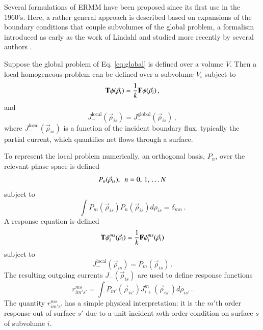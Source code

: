 Several formulations of ERMM have been proposed since its first use in 
the 1960's. Here, a rather general approach is described based 
on expansions of the boundary conditions that couple
subvolumes of the global problem, a formalism introduced 
as early as the work of Lindahl \cite{lindahl1976mdr} and
studied more recently by several authors
\cite{mosher2006ifr, roberts2011ser, roberts2012ksi}.  

Suppose the global problem 
of Eq. \ref{eq:global} is defined over a 
volume $V$.  Then a local homogeneous problem can be defined over a 
subvolume $V_i$ subject to 
\begin{equation}
  \mathbf{T} \phi(\vec{\rho}_i) = 
    \frac{1}{k} \mathbf{F} \phi(\vec{\rho}_i) \, ,
  \label{eq:local}
\end{equation}
and
\begin{equation}
  J^{\mathrm{local}}_{-} (\vec{\rho}_{is}) = 
    J^{\mathrm{global}}_{-}(\vec{\rho}_{is}) \, ,
  \label{eq:localbc}
\end{equation}   
where $J^{\mathrm{local}}_{-} (\vec{\rho}_{is}) $ is a 
function of the incident boundary flux, typically the 
partial current, which quantifies net flows through a 
surface.

To represent the local problem numerically, an orthogonal basis, $P_n$,
over the relevant phase space is defined
\begin{equation}
  P_n(\vec{\rho}_{is}), \,\,\, n = 0, \, 1, \, \ldots N  \\
\end{equation}
subject to
\begin{equation}
   \int P_m(\vec{\rho}_{is}) P_n(\vec{\rho}_{is})  d\rho_{is}
     = \delta_{mn} \, .
\end{equation}
A response equation is defined 
\begin{equation}
 \mathbf{T} \phi_{i}^{ms} (\vec{\rho}_i) = 
   \frac{1}{k} \mathbf{F} \phi_{i}^{ms} (\vec{\rho}_i) 
\end{equation}
subject to
\begin{equation}
 J^{\mathrm{local}}_{-} (\vec{\rho}_{is}) = P_m(\vec{\rho}_{is}) \, .
\end{equation}
The resulting outgoing currents $J_{-} (\vec{\rho}_{is}) $ are used to define
response functions
\begin{equation}
       r^{ms}_{im's'} = \int  P_{m'}(\vec{\rho}_{is'})  
        J_{i+}^{m} (\vec{\rho}_{is'}) d\rho_{is'} \, .
\label{eq:responsefunction}
\end{equation}
The quantity $r^{ms}_{im's'}$ has a simple physical
interpretation: it is the $m'$th order response 
out of surface $s'$ due to a unit incident $m$th order condition on 
surface $s$ of subvolume $i$. 

